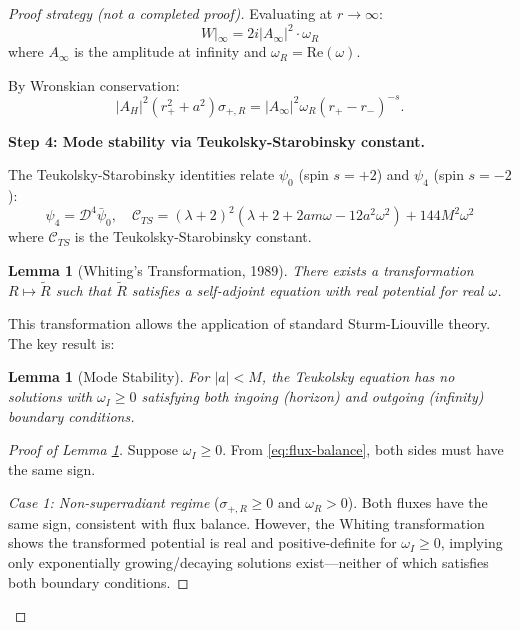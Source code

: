 \documentclass[12pt,a4paper]{article}
\newtheorem{lemma}[theorem]{Lemma}
\begin{document}
\begin{proof}[Proof strategy (not a completed proof)]
Evaluating at $r \to \infty$:
\begin{equation}
W|_\infty = 2i|A_\infty|^2 \cdot \omega_R
\end{equation}
where $A_\infty$ is the amplitude at infinity and $\omega_R = \text{Re}(\omega)$.

By Wronskian conservation:
\begin{equation}\label{eq:flux-balance}
|A_H|^2 (r_+^2 + a^2)\sigma_{+,R} = |A_\infty|^2 \omega_R (r_+ - r_-)^{-s}.
\end{equation}

\textbf{Step 4: Mode stability via Teukolsky-Starobinsky constant.}

The Teukolsky-Starobinsky identities relate $\psi_0$ (spin $s=+2$) and $\psi_4$ (spin $s=-2$):
\begin{equation}
\psi_4 = \mathcal{D}^4 \bar{\psi}_0, \quad \mathcal{C}_{TS} = (\lambda+2)^2(\lambda+2+2am\omega-12a^2\omega^2) + 144M^2\omega^2
\end{equation}
where $\mathcal{C}_{TS}$ is the Teukolsky-Starobinsky constant.

\begin{lemma}[Whiting's Transformation, 1989]
There exists a transformation $R \mapsto \tilde{R}$ such that $\tilde{R}$ satisfies a self-adjoint equation with real potential for real $\omega$.
\end{lemma}

This transformation allows the application of standard Sturm-Liouville theory. The key result is:

\begin{lemma}[Mode Stability]\label{lem:mode-stability}
For $|a| < M$, the Teukolsky equation has no solutions with $\omega_I \geq 0$ satisfying both ingoing (horizon) and outgoing (infinity) boundary conditions.
\end{lemma}

\begin{proof}[Proof of Lemma \ref{lem:mode-stability}]
Suppose $\omega_I \geq 0$. From \eqref{eq:flux-balance}, both sides must have the same sign.

\textit{Case 1: Non-superradiant regime} ($\sigma_{+,R} \geq 0$ and $\omega_R > 0$). Both fluxes have the same sign, consistent with flux balance. However, the Whiting transformation shows the transformed potential is real and positive-definite for $\omega_I \geq 0$, implying only exponentially growing/decaying solutions exist---neither of which satisfies both boundary conditions.


\end{proof}
\end{proof}
\end{document}
